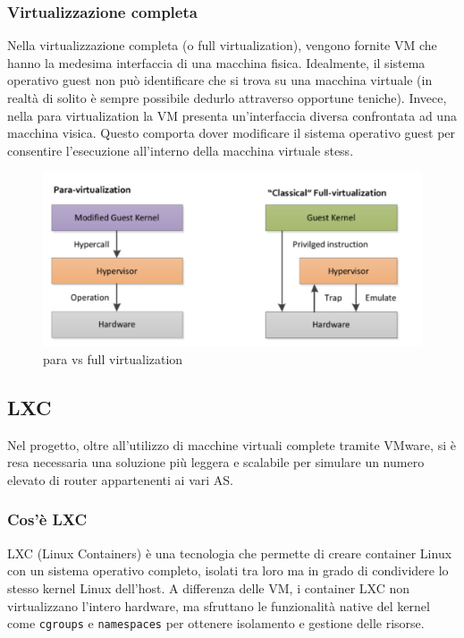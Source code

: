 \documentclass[12pt,a4paper,twoside]{book}
\begin{document}
\subsubsection{Virtualizzazione completa}
Nella virtualizzazione completa (o full virtualization), vengono fornite \ac{VM} che hanno la medesima interfaccia di una macchina fisica. Idealmente, il sistema operativo guest non può identificare che si trova su una macchina virtuale (in realtà di solito è sempre possibile dedurlo attraverso opportune teniche).
Invece, nella para virtualization la \ac{VM} presenta un'interfaccia diversa confrontata ad una macchina visica. Questo comporta dover modificare il sistema operativo guest per consentire l'esecuzione all'interno della macchina virtuale stess.

\begin{figure}[H]
    \centering
    \includegraphics[width=.8\linewidth]{img/para-full_virtualization.png}
    \caption{para vs full virtualization}
    \label{fig:para-full_virtualization}
\end{figure}

\subsection{LXC}
Nel progetto, oltre all'utilizzo di macchine virtuali complete tramite VMware, si è resa necessaria una soluzione più leggera e scalabile per simulare un numero elevato di router appartenenti ai vari \ac{AS}.

\subsubsection{Cos'è LXC}
LXC (Linux Containers) è una tecnologia che permette di creare container Linux con un sistema operativo completo, isolati tra loro ma in grado di condividere lo stesso kernel Linux dell'host. A differenza delle \ac{VM}, i container LXC non virtualizzano l'intero hardware, ma sfruttano le funzionalità native del kernel come \texttt{cgroups} e \texttt{namespaces} per ottenere isolamento e gestione delle risorse.
\end{document}
